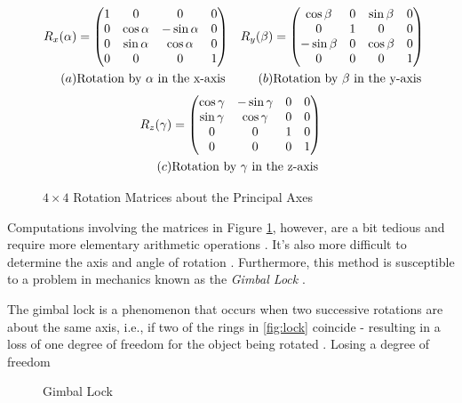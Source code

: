 \begin{figure}[h]
	\begin{align*}
			{R}_{x}{(\alpha)} &=
			\begin{pmatrix}
				1 & 0 & 0 & 0 \\
				0 & \cos{\alpha} & -\sin{\alpha} & 0 \\
				0 & \sin{\alpha} & \cos{\alpha} & 0 \\
				0 & 0 & 0 & 1
			\end{pmatrix}
			&
			{R}_{y}{(\beta)} &=
			\begin{pmatrix}
				\cos{\beta} & 0 & \sin{\beta} & 0 \\
				0 & 1 & 0 & 0 \\
				-\sin{\beta} & 0 & \cos{\beta} & 0 \\
				0 & 0 & 0 & 1
			\end{pmatrix} \\
			(a) & \text{Rotation by $\alpha$ in the x-axis} 
			& 
			(b) & \text{Rotation by $\beta$ in the y-axis}	
	 \end{align*} 
		 \begin{align*}
			{R}_{z}{(\gamma)} &=
			\begin{pmatrix}
				\cos{\gamma} & -\sin{\gamma} & 0 & 0 \\
				\sin{\gamma} & \cos{\gamma} &  0 & 0 \\
				0 & 0 & 1 & 0 \\
				0 & 0 & 0 & 1
		 \end{pmatrix} \\
		 (c) & \text{Rotation by $\gamma$ in the z-axis}	
		\end{align*}
		\caption{$4\times 4$ Rotation Matrices about the Principal Axes}
		\label{4x4}
\end{figure}

Computations involving the matrices in Figure \ref{4x4}, however, are a bit tedious and require more elementary arithmetic operations \cite{lerios}. It's also more difficult to determine the axis and angle of rotation \cite{lerios}. Furthermore, this method is susceptible to a problem in mechanics known as the \emph{Gimbal Lock} \cite{jia}.

The gimbal lock is a phenomenon that occurs when two successive rotations are about the same axis, i.e., if two of the rings in \ref{fig:lock} coincide - resulting in a loss of one degree of freedom for the object being rotated \cite{jia}. Losing a degree of freedom 

\begin{figure}
\centering
{}%
\qquad
{}
\caption{Gimbal Lock}
\label{gimbal}
\end{figure}

